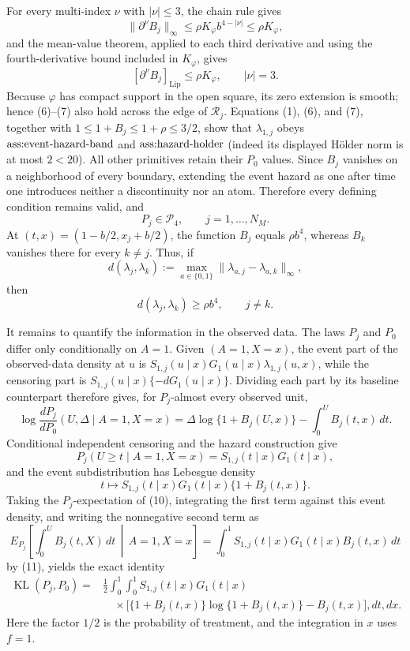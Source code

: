 For every multi-index \(\nu\) with \(|\nu|\le3\), the chain rule gives
\[
 \lVert\partial^\nu B_j\rVert_\infty
 \le \rho K_\varphi b^{4-|\nu|}
 \le \rho K_\varphi,                                    \tag{6}
\]
and the mean-value theorem, applied to each third derivative and using the fourth-derivative bound included in \(K_\varphi\), gives
\[
 [\partial^\nu B_j]_{\mathrm{Lip}}
 \le \rho K_\varphi,
 \qquad |\nu|=3.                                         \tag{7}
\]
Because \(\varphi\) has compact support in the open square, its zero extension is smooth; hence (6)--(7) also hold across the edge of \(\mathcal R_j\).  Equations (1), (6), and (7), together with \(1\le1+B_j\le1+\rho\le3/2\), show that \(\lambda_{1,j}\) obeys \(\textnormal{ass:event-hazard-band}\) and \(\textnormal{ass:hazard-holder}\) (indeed its displayed Hölder norm is at most \(2<20\)).  All other primitives retain their \(P_0\) values.  Since \(B_j\) vanishes on a neighborhood of every boundary, extending the event hazard as one after time one introduces neither a discontinuity nor an atom.  Therefore every defining condition remains valid, and
\[
 P_j\in\mathcal P_4,
 \qquad j=1,\ldots,N_M.                                  \tag{8}
\]
At \((t,x)=(1-b/2,x_j+b/2)\), the function \(B_j\) equals \(\rho b^4\), whereas \(B_k\) vanishes there for every \(k\ne j\).  Thus, if
\[
 d(\lambda_j,\lambda_k)
 :=\max_{a\in\{0,1\}}\lVert\lambda_{a,j}-\lambda_{a,k}\rVert_\infty,
\]
then
\[
 d(\lambda_j,\lambda_k)\ge\rho b^4,
 \qquad j\ne k.                                          \tag{9}
\]

It remains to quantify the information in the observed data.  The laws \(P_j\) and \(P_0\) differ only conditionally on \(A=1\).  Given \((A=1,X=x)\), the event part of the observed-data density at \(u\) is \(S_{1,j}(u\mid x)G_1(u\mid x)\lambda_{1,j}(u,x)\), while the censoring part is \(S_{1,j}(u\mid x)\{-dG_1(u\mid x)\}\).  Dividing each part by its baseline counterpart therefore gives, for \(P_j\)-almost every observed unit,
\[
 \log\frac{dP_j}{dP_0}(U,\Delta\mid A=1,X=x)
 =\Delta\log\{1+B_j(U,x)\}-\int_0^U B_j(t,x)\,dt.       \tag{10}
\]
Conditional independent censoring and the hazard construction give
\[
 P_j(U\ge t\mid A=1,X=x)=S_{1,j}(t\mid x)G_1(t\mid x),  \tag{11}
\]
and the event subdistribution has Lebesgue density
\[
 t\longmapsto S_{1,j}(t\mid x)G_1(t\mid x)\{1+B_j(t,x)\}.
\]
Taking the \(P_j\)-expectation of (10), integrating the first term against this event density, and writing the nonnegative second term as
\[
 E_{P_j}\!\left[\int_0^U B_j(t,X)\,dt\,\middle|\,A=1,X=x\right]
 =\int_0^1 S_{1,j}(t\mid x)G_1(t\mid x)B_j(t,x)\,dt
\]
by (11), yields the exact identity
\[
 \begin{split}
 \operatorname{KL}(P_j,P_0)
 ={}&\frac12\int_0^1\!\int_0^1
 S_{1,j}(t\mid x)G_1(t\mid x)\\
 &\quad\times\bigl[\{1+B_j(t,x)\}\log\{1+B_j(t,x)\}-B_j(t,x)\bigr],dt,dx.
 \end{split}                                               \tag{12}
\]
Here the factor \(1/2\) is the probability of treatment, and the integration in \(x\) uses \(f=1\).

